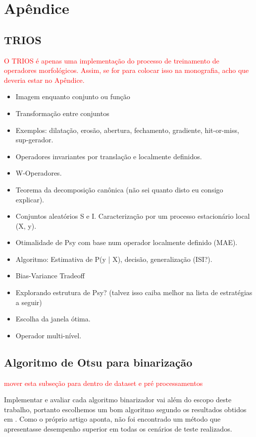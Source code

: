 \documentclass[a4paper,11pt]{article}
\newcommand{\TODO}[1]{\textcolor{red}{#1}}
\begin{document}
\section{Apêndice}

\subsection{TRIOS}

\TODO{O TRIOS é apenas uma implementação do processo de treinamento de
  operadores morfológicos. Assim, se for para colocar isso na
  monografia, acho que deveria estar no Apêndice.}
      \begin{itemize}
        \item Imagem enquanto conjunto ou função
        \item Transformação entre conjuntos
        \item Exemplos: dilatação, erosão, abertura, fechamento, gradiente, hit-or-miss, sup-gerador.
        \item Operadores invariantes por translação e localmente definidos.
        \item W-Operadores.
        \item Teorema da decomposição canônica (não sei quanto disto eu consigo explicar).
        \item Conjuntos aleatórios S e I. Caracterização por um processo estacionário local (X, y).
        \item Otimalidade de Psy com base num operador localmente definido (MAE).
        \item Algoritmo: Estimativa de P(y | X), decisão, generalização (ISI?).
        \item Bias-Variance Tradeoff
        \item Explorando estrutura de Psy? (talvez isso caiba melhor na lista de estratégias a seguir)
        \item Escolha da janela ótima.
        \item Operador multi-nível.
      \end{itemize}

  \subsection{Algoritmo de Otsu para binarização}

    \TODO{mover esta subseção para dentro de dataset e pré processamentos}

    Implementar e avaliar cada algoritmo binarizador vai além do escopo deste trabalho, portanto escolhemos um bom algoritmo segundo os resultados obtidos em \cite{citeulike:890354}. Como o próprio artigo aponta, não foi encontrado um método que apresentasse desempenho superior em todas os cenários de teste realizados.
\end{document}
